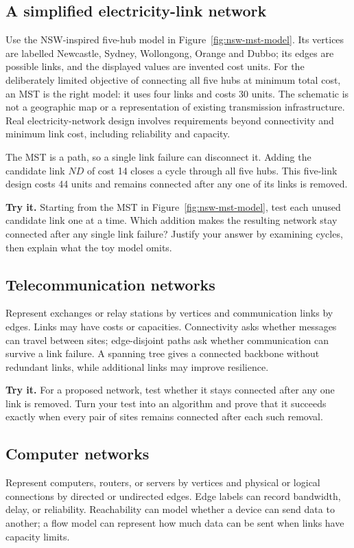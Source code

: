 \subsection{A simplified electricity-link network}
Use the NSW-inspired five-hub model in Figure~\ref{fig:nsw-mst-model}. Its vertices are labelled Newcastle, Sydney, Wollongong, Orange and Dubbo; its edges are possible links, and the displayed values are invented cost units. For the deliberately limited objective of connecting all five hubs at minimum total cost, an MST is the right model: it uses four links and costs 30 units. The schematic is not a geographic map or a representation of existing transmission infrastructure. Real electricity-network design involves requirements beyond connectivity and minimum link cost, including reliability and capacity.

The MST is a path, so a single link failure can disconnect it. Adding the candidate link $ND$ of cost 14 closes a cycle through all five hubs. This five-link design costs 44 units and remains connected after any one of its links is removed.

\textbf{Try it.} Starting from the MST in Figure~\ref{fig:nsw-mst-model}, test each unused candidate link one at a time. Which addition makes the resulting network stay connected after any single link failure? Justify your answer by examining cycles, then explain what the toy model omits.

\subsection{Telecommunication networks}
Represent exchanges or relay stations by vertices and communication links by edges. Links may have costs or capacities. Connectivity asks whether messages can travel between sites; edge-disjoint paths ask whether communication can survive a link failure. A spanning tree gives a connected backbone without redundant links, while additional links may improve resilience.

\textbf{Try it.} For a proposed network, test whether it stays connected after any one link is removed. Turn your test into an algorithm and prove that it succeeds exactly when every pair of sites remains connected after each such removal.

\subsection{Computer networks}
Represent computers, routers, or servers by vertices and physical or logical connections by directed or undirected edges. Edge labels can record bandwidth, delay, or reliability. Reachability can model whether a device can send data to another; a flow model can represent how much data can be sent when links have capacity limits.

